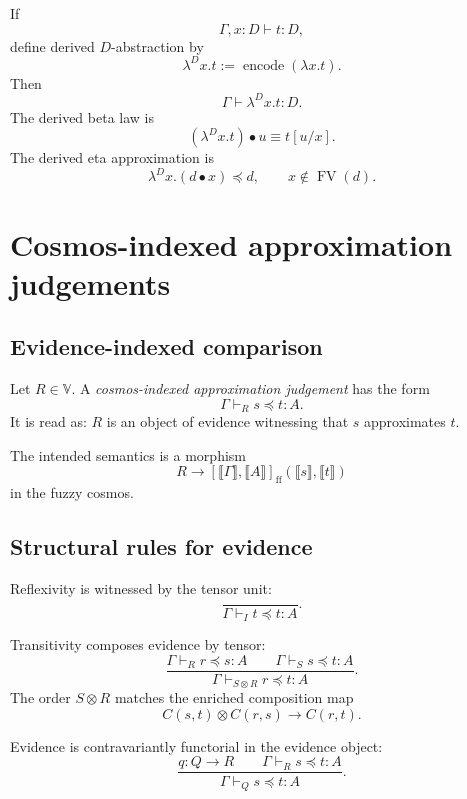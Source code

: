If
\[
    \Gamma,x:D\vdash t:D,
\]
define derived \(D\)-abstraction by
\[
    \lambda^D x.t
    :=
    \operatorname{encode}(\lambda x.t).
\]
Then
\[
    \Gamma\vdash \lambda^D x.t:D.
\]
The derived beta law is
\[
    (\lambda^D x.t)\bullet u
    \equiv
    t[u/x].
\]
The derived eta approximation is
\[
    \lambda^D x.(d\bullet x)
    \preceq
    d,
    \qquad
    x\notin \operatorname{FV}(d).
\]

\section{Cosmos-indexed approximation judgements}
\label{sec:cosmos-indexed-approximation-judgements}

\subsection{Evidence-indexed comparison}
\label{subsec:evidence-indexed-comparison}

\begin{definition}
\label{def:cosmos-indexed-approximation-judgement}
Let \(R\in\mathbb V\).  A \emph{cosmos-indexed approximation judgement} has
the form
\[
    \Gamma\vdash_R s\preceq t:A.
\]
It is read as: \(R\) is an object of evidence witnessing that \(s\)
approximates \(t\).
\end{definition}

The intended semantics is a morphism
\[
    R
    \longrightarrow
    [\llbracket \Gamma\rrbracket,
     \llbracket A\rrbracket]_{\mathrm{ff}}
    (\llbracket s\rrbracket,\llbracket t\rrbracket)
\]
in the fuzzy cosmos.

\subsection{Structural rules for evidence}
\label{subsec:structural-rules-evidence}

Reflexivity is witnessed by the tensor unit:
\[
    \frac{}
         {\Gamma\vdash_I t\preceq t:A}.
\]

Transitivity composes evidence by tensor:
\[
    \frac{\Gamma\vdash_R r\preceq s:A
          \qquad
          \Gamma\vdash_S s\preceq t:A}
         {\Gamma\vdash_{S\otimes R} r\preceq t:A}.
\]
The order \(S\otimes R\) matches the enriched composition map
\[
    C(s,t)\otimes C(r,s)
    \longrightarrow
    C(r,t).
\]

Evidence is contravariantly functorial in the evidence object:
\[
    \frac{q:Q\to R
          \qquad
          \Gamma\vdash_R s\preceq t:A}
         {\Gamma\vdash_Q s\preceq t:A}.
\]

